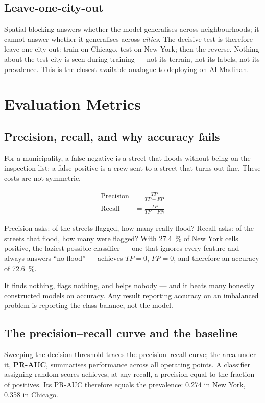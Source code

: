 \documentclass[11pt,a4paper]{article}
\begin{document}
\subsection{Leave-one-city-out}
Spatial blocking answers whether the model generalises across neighbourhoods; it cannot
answer whether it generalises across \emph{cities}. The decisive test is therefore
leave-one-city-out: train on Chicago, test on New York; then the reverse. Nothing about
the test city is seen during training --- not its terrain, not its labels, not its
prevalence. This is the closest available analogue to deploying on Al Madinah.

\section{Evaluation Metrics}\label{sec:metrics}

\subsection{Precision, recall, and why accuracy fails}
For a municipality, a false negative is a street that floods without being on the
inspection list; a false positive is a crew sent to a street that turns out fine. These
costs are not symmetric.

\begin{align}
\text{Precision} &= \frac{TP}{TP+FP} \\
\text{Recall} &= \frac{TP}{TP+FN}
\end{align}

Precision asks: of the streets flagged, how many really flood? Recall asks: of the streets
that flood, how many were flagged? With \SI{27.4}{\percent} of New York cells positive,
the laziest possible classifier --- one that ignores every feature and always answers
``no flood'' --- achieves $TP=0$, $FP=0$, and therefore an accuracy of
\SI{72.6}{\percent}.

\begin{trapbox}
It finds nothing, flags nothing, and helps nobody --- and it beats many honestly
constructed models on accuracy. Any result reporting accuracy on an imbalanced problem is
reporting the class balance, not the model.
\end{trapbox}

\subsection{The precision--recall curve and the baseline}
Sweeping the decision threshold traces the precision--recall curve; the area under it,
\textbf{PR-AUC}, summarises performance across all operating points. A classifier
assigning random scores achieves, at any recall, a precision equal to the fraction of
positives. Its PR-AUC therefore equals the prevalence: \num{0.274} in New York,
\num{0.358} in Chicago.
\end{document}
